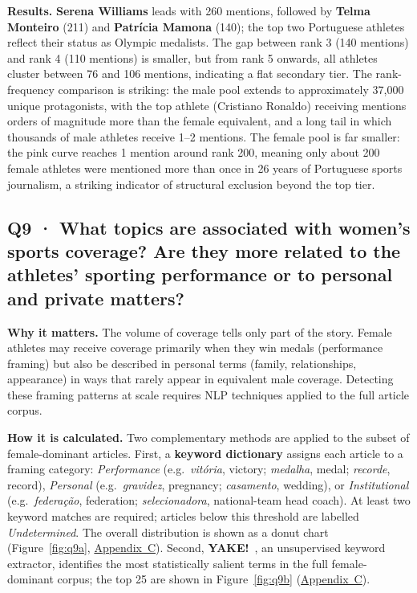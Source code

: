 \documentclass[11pt,a4paper]{article}
\begin{document}
\textbf{Results.} \textbf{Serena Williams} leads with 260 mentions, followed by \textbf{Telma Monteiro} (211) and \textbf{Patrícia Mamona} (140); the top two Portuguese athletes reflect their status as Olympic medalists. The gap between rank 3 (140 mentions) and rank 4 (110 mentions) is smaller, but from rank 5 onwards, all athletes cluster between 76 and 106 mentions, indicating a flat secondary tier. The rank-frequency comparison is striking: the male pool extends to approximately 37{,}000 unique protagonists, with the top athlete (Cristiano Ronaldo) receiving mentions orders of magnitude more than the female equivalent, and a long tail in which thousands of male athletes receive 1–2 mentions. The female pool is far smaller: the pink curve reaches 1 mention around rank 200, meaning only about 200 female athletes were mentioned more than once in 26 years of Portuguese sports journalism, a striking indicator of structural exclusion beyond the top tier.

\subsection[Q9 · Performance vs.\ personal framing in women's coverage]{Q9 · What topics are associated with women's sports coverage? Are they more related to the athletes' sporting performance or to personal and private matters?}

\textbf{Why it matters.} The volume of coverage tells only part of the story. Female athletes may receive coverage primarily when they win medals (performance framing) but also be described in personal terms (family, relationships, appearance) in ways that rarely appear in equivalent male coverage. Detecting these framing patterns at scale requires NLP techniques applied to the full article corpus.

\textbf{How it is calculated.} Two complementary methods are applied to the subset of female-dominant articles. First, a \textbf{keyword dictionary} assigns each article to a framing category: \textit{Performance} (e.g.\ \textit{vitória}, victory; \textit{medalha}, medal; \textit{recorde}, record), \textit{Personal} (e.g.\ \textit{gravidez}, pregnancy; \textit{casamento}, wedding), or \textit{Institutional} (e.g.\ \textit{federação}, federation; \textit{selecionadora}, national-team head coach). At least two keyword matches are required; articles below this threshold are labelled \textit{Undetermined}. The overall distribution is shown as a donut chart (Figure~\ref{fig:q9a}, \hyperref[app:figures]{Appendix~C}). Second, \textbf{YAKE!}~\cite{Campos2020}, an unsupervised keyword extractor, identifies the most statistically salient terms in the full female-dominant corpus; the top 25 are shown in Figure~\ref{fig:q9b} (\hyperref[app:figures]{Appendix~C}).
\end{document}
